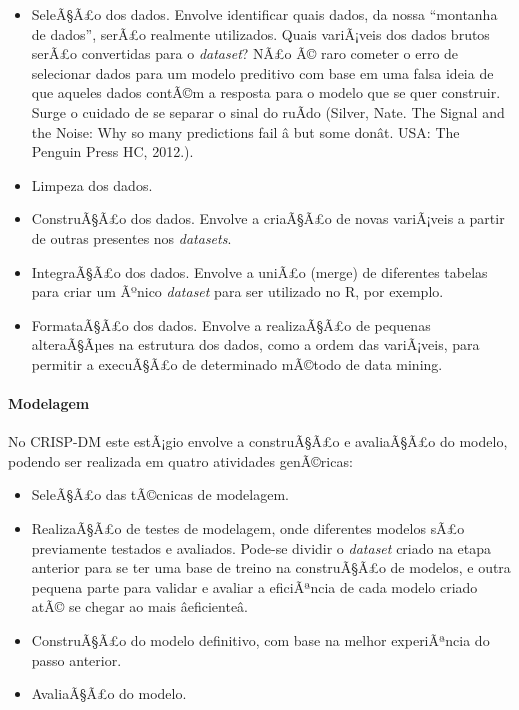 \documentclass[]{article}
\let\oldparagraph\paragraph
\renewcommand{\paragraph}[1]{\oldparagraph{#1}\mbox{}}
\begin{document}
\begin{itemize}
\item
  SeleÃ§Ã£o dos dados. Envolve identificar quais dados, da nossa
  ``montanha de dados'', serÃ£o realmente utilizados. Quais variÃ¡veis
  dos dados brutos serÃ£o convertidas para o \emph{dataset}? NÃ£o Ã©
  raro cometer o erro de selecionar dados para um modelo preditivo com
  base em uma falsa ideia de que aqueles dados contÃ©m a resposta para o
  modelo que se quer construir. Surge o cuidado de se separar o sinal do
  ruÃ­do (Silver, Nate. The Signal and the Noise: Why so many
  predictions fail â but some donât. USA: The Penguin Press HC,
  2012.).
\item
  Limpeza dos dados.
\item
  ConstruÃ§Ã£o dos dados. Envolve a criaÃ§Ã£o de novas variÃ¡veis a
  partir de outras presentes nos \emph{datasets}.
\item
  IntegraÃ§Ã£o dos dados. Envolve a uniÃ£o (merge) de diferentes tabelas
  para criar um Ãºnico \emph{dataset} para ser utilizado no R, por
  exemplo.
\item
  FormataÃ§Ã£o dos dados. Envolve a realizaÃ§Ã£o de pequenas
  alteraÃ§Ãµes na estrutura dos dados, como a ordem das variÃ¡veis, para
  permitir a execuÃ§Ã£o de determinado mÃ©todo de data mining.
\end{itemize}

\paragraph{\texorpdfstring{\textbf{Modelagem}}{Modelagem}}\label{modelagem}

No CRISP-DM este estÃ¡gio envolve a construÃ§Ã£o e avaliaÃ§Ã£o do
modelo, podendo ser realizada em quatro atividades genÃ©ricas:

\begin{itemize}
\item
  SeleÃ§Ã£o das tÃ©cnicas de modelagem.
\item
  RealizaÃ§Ã£o de testes de modelagem, onde diferentes modelos sÃ£o
  previamente testados e avaliados. Pode-se dividir o \emph{dataset}
  criado na etapa anterior para se ter uma base de treino na
  construÃ§Ã£o de modelos, e outra pequena parte para validar e avaliar
  a eficiÃªncia de cada modelo criado atÃ© se chegar ao mais
  âeficienteâ.
\item
  ConstruÃ§Ã£o do modelo definitivo, com base na melhor experiÃªncia do
  passo anterior.
\item
  AvaliaÃ§Ã£o do modelo.
\end{itemize}
\end{document}
